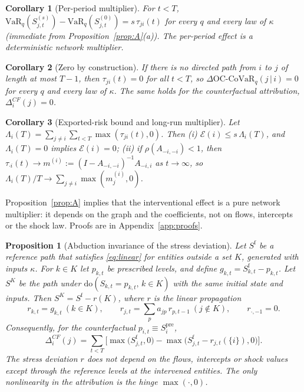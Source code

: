 \documentclass[referee,pdflatex,sn-mathphys-ay]{sn-jnl}
\theoremstyle{thmstyleone}%
\newtheorem{proposition}[theorem]{Proposition}%
\newtheorem{corollary}{Corollary}%
\theoremstyle{thmstyletwo}%
\theoremstyle{thmstylethree}%
\newcommand{\doop}{\mathrm{do}}
\newcommand{\VaR}{\mathrm{VaR}}
\newcommand{\OCCoVaR}{\text{OC-CoVaR}}
\begin{document}
\begin{corollary}[Per-period multiplier]
\label{cor:pure}
For $t<T$, $\VaR_q(S^{(s)}_{j,t})-\VaR_q(S^{(0)}_{j,t})=s\,\tau_{ji}(t)$ for every
$q$ and every law of $\kappa$ (immediate from Proposition~\ref{prop:A}(a)). The per-period effect is a deterministic network
multiplier.
\end{corollary}

\begin{corollary}[Zero by construction]
\label{cor:zero}
If there is no directed path from $i$ to $j$ of length at most $T-1$, then
$\tau_{ji}(t)=0$ for all $t<T$, so $\Delta\OCCoVaR_q(j\,|\,i)=0$ for every $q$ and every
law of $\kappa$. The same holds for the counterfactual attribution, $\Delta_i^{CF}(j)=0$.
\end{corollary}

\begin{corollary}[Exported-risk bound and long-run multiplier]
\label{cor:bound}
Let $\Lambda_i(T)=\sum_{j\ne i}\sum_{t<T}\max(\tau_{ji}(t),0)$. Then
(i) $\mathcal{E}(i)\le s\,\Lambda_i(T)$, and $\Lambda_i(T)=0$ implies $\mathcal{E}(i)=0$;
(ii) if $\rho(A_{-i,-i})<1$, then $\tau_{\cdot i}(t)\to m^{(i)}:=(I-A_{-i,-i})^{-1}A_{-i,i}$
as $t\to\infty$, so $\Lambda_i(T)/T\to\sum_{j\ne i}\max(m^{(i)}_j,0)$.
\end{corollary}

Proposition~\ref{prop:A} implies that the interventional effect is a pure network multiplier: it depends on the graph and the coefficients, not on flows, intercepts or the shock law. Proofs are in Appendix~\ref{app:proofs}.

\begin{proposition}[Abduction invariance of the stress deviation]
\label{prop:B}
Let $S^{\mathrm f}$ be a reference path that satisfies \eqref{eq:linear} for entities
outside a set $K$, generated with inputs $\kappa$. For $k\in K$ let $p_{k,t}$ be
prescribed levels, and define $g_{k,t}=S^{\mathrm f}_{k,t}-p_{k,t}$. Let $S^{K}$ be the path
under $\doop(S_{k,t}=p_{k,t},\,k\in K)$ with the same initial state and inputs. Then
$S^{K}=S^{\mathrm f}-r(K)$, where $r$ is the linear propagation
\begin{equation}
\label{eq:propagate}
r_{k,t}=g_{k,t}\ (k\in K),\qquad r_{j,t}=\sum_{p}a_{jp}\,r_{p,t-1}\ (j\notin K),
\qquad r_{\cdot,-1}=0.
\end{equation}
Consequently, for the counterfactual $p_{i,t}\equiv S_i^{\mathrm{pre}}$,
\begin{equation}
\label{eq:cfhinge}
\Delta_i^{CF}(j)=\sum_{t<T}\Big[\max\big(S^{\mathrm f}_{j,t},0\big)-\max\big(S^{\mathrm f}_{j,t}-r_{j,t}(\{i\}),0\big)\Big].
\end{equation}
The stress deviation $r$ does not depend on the flows, intercepts or shock values except
through the reference levels at the intervened entities. The only nonlinearity in the
attribution is the hinge $\max(\cdot,0)$.
\end{proposition}
\end{document}

